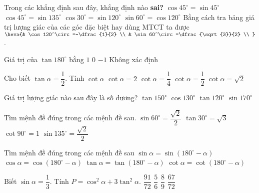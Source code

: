 \begin{ex}
	Trong các khẳng định sau đây, khẳng định nào \textbf{sai?}
	\choice
	{$\cos 45^\circ=\sin 45^\circ$}
	{$\cos 45^\circ=\sin {135^\circ}$}
	{$\cos 30^\circ=\sin 120^\circ$}
	{\True $\sin 60^\circ=\cos 120^\circ$}
	\loigiai
	{Bằng cách tra bảng giá trị lượng giác của các góc đặc biệt hay dùng MTCT ta được $\heva{& \cos 120^\circ=-\dfrac{1}{2} \\ 
			& \sin 60^\circ=\dfrac{\sqrt{3}}{2} \\ 
		}$.}
\end{ex}
\begin{ex}
	Giá trị của $\tan180^\circ$ bằng
	\choice
	{$1$}
	{\True $0$}
	{$-1$}
	{Không xác định}
\end{ex}
\begin{ex}
	Cho biết $\tan\alpha=\dfrac{1}{2}$. Tính $\cot\alpha$
	\choice
	{\True $\cot\alpha=2$}
	{$\cot\alpha=\dfrac{1}{4}$}
	{$\cot\alpha=\dfrac{1}{2}$}
	{$\cot\alpha=\sqrt{2}$}
\end{ex}
\begin{ex}
	Giá trị lượng giác nào sau đây là số dương?
	\choice
	{$\tan 150^\circ$}
	{$\cos 130^\circ$}
	{$\tan 120^\circ$}
	{\True $\sin 170^\circ$}
\end{ex} 
\begin{ex}
	Tìm mệnh đề đúng trong các mệnh đề sau.
	\choice
	{$\sin 60^\circ=\dfrac{\sqrt{2}}{2}$}
	{$\tan 30^\circ=\sqrt{3}$}
	{$\cot 90^\circ=1$}
	{\True $\sin 135^\circ=\dfrac{\sqrt{2}}{2}$}
\end{ex}
\begin{ex}
	Tìm mệnh đề đúng trong các mệnh đề sau
	\choice
	{\True $\sin\alpha=\sin(180^\circ-\alpha)$}
	{$\cos\alpha=\cos(180^\circ-\alpha)$}
	{$\tan\alpha=\tan(180^\circ-\alpha)$}
	{$\cot\alpha=\cot(180^\circ-\alpha)$}
\end{ex}
\begin{ex}
	Biết $\sin\alpha=\dfrac{1}{3}$. Tính $P=\cos^2\alpha+3\tan^2\alpha$.
	\choice
	{\True $\dfrac{91}{72}$}
	{$\dfrac{5}{6}$}
	{$\dfrac{8}{9}$}
	{$\dfrac{67}{72}$}
\end{ex}
